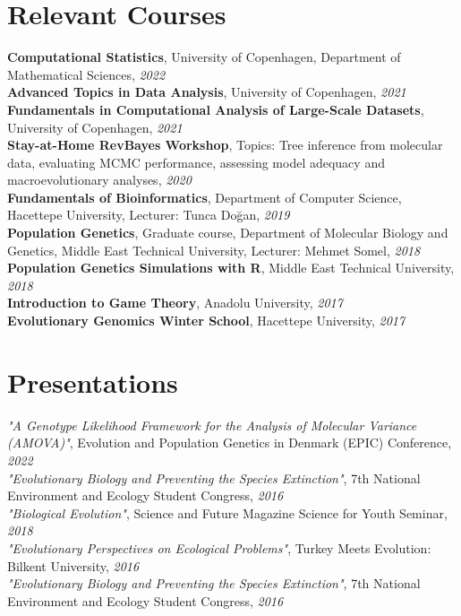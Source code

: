 \documentclass[letterpaper,10.5pt]{article}
\begin{document}
\section{Relevant Courses}
\textbf{Computational Statistics}, University of Copenhagen, Department of Mathematical Sciences, \textit{2022} \\
\textbf{Advanced Topics in Data Analysis}, University of Copenhagen, \textit{2021} \\
\textbf{Fundamentals in Computational Analysis of Large-Scale Datasets}, University of Copenhagen, \textit{2021} \\
\textbf{Stay-at-Home RevBayes Workshop}, Topics: Tree inference from molecular data, evaluating MCMC performance, assessing model adequacy and macroevolutionary analyses, \textit{2020} \\
\textbf{Fundamentals of Bioinformatics}, Department of Computer Science, Hacettepe University, Lecturer: Tunca Do\u{g}an,  \textit{2019} \\
\textbf{Population Genetics}, Graduate course, Department of Molecular Biology and Genetics, Middle East Technical University, Lecturer: Mehmet Somel, \textit{2018} \\
\textbf{Population Genetics Simulations with R}, Middle East Technical University, \textit{2018} \\
\textbf{Introduction to Game Theory}, Anadolu University, \textit{2017} \\
\textbf{Evolutionary Genomics Winter School}, Hacettepe University, \textit{2017}  \\

\section{Presentations}
{\textit{"A Genotype Likelihood Framework for the Analysis of Molecular Variance (AMOVA)"}}, Evolution and Population Genetics in Denmark (EPIC) Conference,  \textit{2022} \\
{\textit{"Evolutionary Biology and Preventing the Species Extinction"}}, 7th National Environment and Ecology Student Congress,  \textit{2016} \\
{\textit{"Biological Evolution"}}, Science and Future Magazine Science for Youth Seminar,  \textit{2018} \\
{\textit{"Evolutionary Perspectives on Ecological Problems"}}, Turkey Meets Evolution: Bilkent University,  \textit{2016} \\
{\textit{"Evolutionary Biology and Preventing the Species Extinction"}}, 7th National Environment and Ecology Student Congress,  \textit{2016} \\
\end{document}
